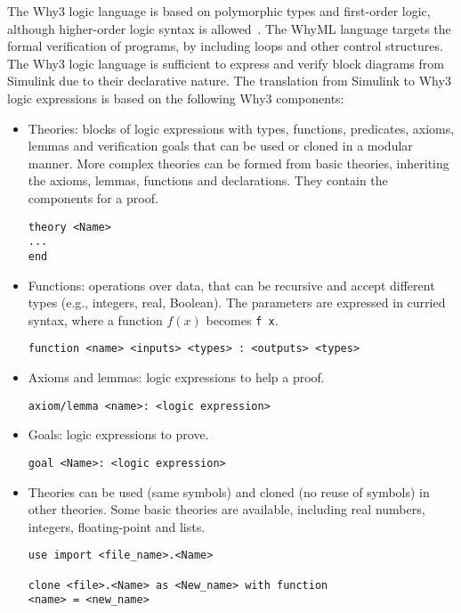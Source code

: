 \documentclass[a4paper]{article}
\begin{document}
The Why3 logic language is based on polymorphic types and first-order logic, although higher-order logic syntax is allowed~\cite{Why3b,Why3man}. The WhyML language targets the formal verification of programs, by including loops and other control structures. The Why3 logic language is sufficient to express and verify block diagrams from Simulink due to their declarative nature. The translation from Simulink to Why3 logic expressions is based on the following Why3 components: 
\begin{itemize}
\item Theories: blocks of logic expressions with types, functions, predicates, axioms, lemmas and verification goals that can be used or cloned in a modular manner. More complex theories can be formed from basic theories, inheriting the axioms, lemmas, functions and declarations. They contain the components for a proof. 

\begin{verbatim}
theory <Name>
...
end
\end{verbatim}

\item Functions: operations over data, that can be recursive and accept different types (e.g., integers, real, Boolean). The parameters are expressed in curried syntax, where a function $f(x)$ becomes \verb+f x+. 

\begin{verbatim}
function <name> <inputs> <types> : <outputs> <types>
\end{verbatim}

\item Axioms and lemmas: logic expressions to help a proof. 

\begin{verbatim}
axiom/lemma <name>: <logic expression>
\end{verbatim}

\item Goals: logic expressions to prove. 

\begin{verbatim}
goal <Name>: <logic expression>
\end{verbatim}

\item Theories can be used (same symbols) and cloned (no reuse of symbols) in other theories. Some basic theories are available, including real numbers, integers, floating-point and lists. 

\begin{verbatim}
use import <file_name>.<Name>

clone <file>.<Name> as <New_name> with function 
<name> = <new_name>
\end{verbatim}
\end{itemize}
\end{document}

